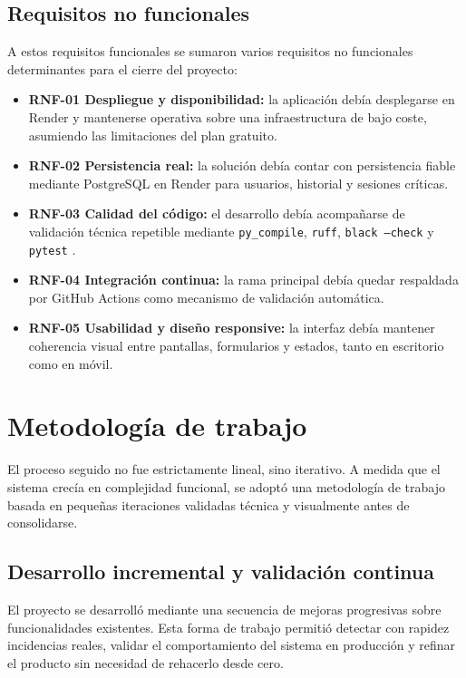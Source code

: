 \subsection{Requisitos no funcionales}

A estos requisitos funcionales se sumaron varios requisitos no funcionales determinantes para el cierre del proyecto:

\begin{itemize}
    \item \textbf{RNF-01 Despliegue y disponibilidad:} la aplicación debía desplegarse en Render \cite{render} y mantenerse operativa sobre una infraestructura de bajo coste, asumiendo las limitaciones del plan gratuito.
    \item \textbf{RNF-02 Persistencia real:} la solución debía contar con persistencia fiable mediante PostgreSQL en Render para usuarios, historial y sesiones críticas.
    \item \textbf{RNF-03 Calidad del código:} el desarrollo debía acompañarse de validación técnica repetible mediante \texttt{py\_compile}, \texttt{ruff}, \texttt{black --check} y \texttt{pytest} \cite{pytest,ruff,pep8}.
    \item \textbf{RNF-04 Integración continua:} la rama principal debía quedar respaldada por GitHub Actions \cite{github_actions} como mecanismo de validación automática.
    \item \textbf{RNF-05 Usabilidad y diseño responsive:} la interfaz debía mantener coherencia visual entre pantallas, formularios y estados, tanto en escritorio como en móvil.
\end{itemize}

\section{Metodología de trabajo}

El proceso seguido no fue estrictamente lineal, sino iterativo. A medida que el sistema crecía en complejidad funcional, se adoptó una metodología de trabajo basada en pequeñas iteraciones validadas técnica y visualmente antes de consolidarse.

\subsection{Desarrollo incremental y validación continua}

El proyecto se desarrolló mediante una secuencia de mejoras progresivas sobre funcionalidades existentes. Esta forma de trabajo permitió detectar con rapidez incidencias reales, validar el comportamiento del sistema en producción y refinar el producto sin necesidad de rehacerlo desde cero.

